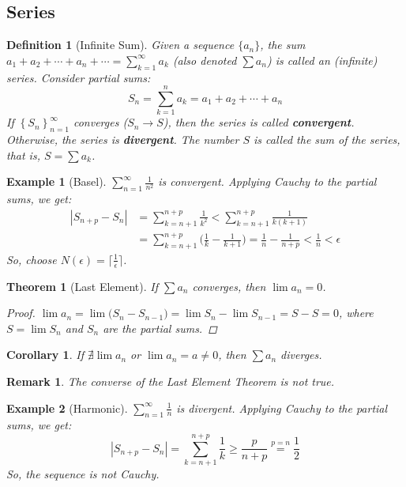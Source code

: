 \documentclass[12pt]{article}
\newcommand{\seq}[2]{\left\{{#1}\right\}_{#2 =1}^\infty}
\newtheorem{theorem}{Theorem}[subsection]
\newtheorem{definition}{Definition}[subsection]
\newtheorem{corollary}{Corollary}[subsection]
\newtheorem{example}{Example}[subsection]
\newtheorem{remark}{Remark}[subsection]
\begin{document}
\pagebreak

\subsection{Series}

\begin{definition}[Infinite Sum]
  Given a sequence $\{a_n\}$, the sum $a_1+a_2+\cdots+a_n+\cdots=\sum_{k=1}^\infty a_k$ (also denoted $\sum a_n$) is called an (infinite) series. Consider partial sums:
  $$S_n=\sum_{k=1}^n a_k=a_1+a_2+\cdots+a_n$$
  If $\seq{S_n}{n}$ converges ($S_n\to S$), then the series is called \textbf{convergent}. Otherwise, the series is \textbf{divergent}. The number $S$ is called the sum of the series, that is, $S=\sum a_k$.
\end{definition}

\begin{example}[Basel]
  $\displaystyle\sum_{n=1}^\infty\frac{1}{n^2}$ is convergent. Applying Cauchy to the partial sums, we get:
  \begin{align*}
    |S_{n+p}-S_n|&=\sum_{k=n+1}^{n+p} \frac{1}{k^2} <\sum_{k=n+1}^{n+p} \frac{1}{k(k+1)}\\
    &=\sum_{k=n+1}^{n+p} \bigg(\frac{1}{k}-\frac{1}{k+1}\bigg)=\frac{1}{n}-\frac{1}{n+p}<\frac{1}{n}<\epsilon
  \end{align*}
  So, choose $N(\epsilon)=\lceil\frac{1}{\epsilon}\rceil$.
\end{example}

\begin{theorem}[Last Element]
  If $\sum a_n$ converges, then $\lim a_n=0$.
  \begin{proof}
    $\lim a_n =\lim \big(S_n-S_{n-1}\big)=\lim S_n - \lim S_{n-1}=S-S=0$, where $S=\lim S_n$ and $S_n$ are the partial sums.
  \end{proof}
\end{theorem}

\begin{corollary}
  If $\nexists\lim a_n$ or $\lim a_n = a \neq 0$, then $\sum a_n$ diverges.
\end{corollary}

\begin{remark}
  The converse of the Last Element Theorem is not true.
\end{remark}

\begin{example}[Harmonic]
  $\displaystyle\sum_{n=1}^\infty\frac{1}{n}$ is divergent. Applying Cauchy to the partial sums, we get:
  $$|S_{n+p}-S_n|=\sum_{k=n+1}^{n+p} \frac{1}{k} \geq \frac{p}{n+p}\overset{p=n}{=}\frac{1}{2}$$
  So, the sequence is not Cauchy.
\end{example}
\end{document}
